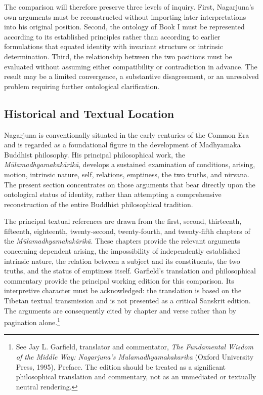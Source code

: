 \label{para:VS.B01.P01.C08.S18.SS01.P003}
The comparison will therefore preserve three levels of inquiry. First, Nagarjuna's own arguments must be reconstructed without importing later interpretations into his original position. Second, the ontology of Book I must be represented according to its established principles rather than according to earlier formulations that equated identity with invariant structure or intrinsic determination. Third, the relationship between the two positions must be evaluated without assuming either compatibility or contradiction in advance. The result may be a limited convergence, a substantive disagreement, or an unresolved problem requiring further ontological clarification.

\subsection{Historical and Textual Location}
\label{subsec:ch08_s18_ss02}

\label{para:VS.B01.P01.C08.S18.SS02.P001}
Nagarjuna is conventionally situated in the early centuries of the Common Era and is regarded as a foundational figure in the development of Madhyamaka Buddhist philosophy. His principal philosophical work, the \emph{M\={u}lamadhyamakak\={a}rik\={a}}, develops a sustained examination of conditions, arising, motion, intrinsic nature, self, relations, emptiness, the two truths, and nirvana. The present section concentrates on those arguments that bear directly upon the ontological status of identity, rather than attempting a comprehensive reconstruction of the entire Buddhist philosophical tradition.

\label{para:VS.B01.P01.C08.S18.SS02.P002}
The principal textual references are drawn from the first, second, thirteenth, fifteenth, eighteenth, twenty-second, twenty-fourth, and twenty-fifth chapters of the \emph{M\={u}lamadhyamakak\={a}rik\={a}}. These chapters provide the relevant arguments concerning dependent arising, the impossibility of independently established intrinsic nature, the relation between a subject and its constituents, the two truths, and the status of emptiness itself. Garfield's translation and philosophical commentary provide the principal working edition for this comparison. Its interpretive character must be acknowledged: the translation is based on the Tibetan textual transmission and is not presented as a critical Sanskrit edition. The arguments are consequently cited by chapter and verse rather than by pagination alone.\footnote{See Jay L. Garfield, translator and commentator, \emph{The Fundamental Wisdom of the Middle Way: Nagarjuna's Mulamadhyamakakarika} (Oxford University Press, 1995), Preface. The edition should be treated as a significant philosophical translation and commentary, not as an unmediated or textually neutral rendering.}

